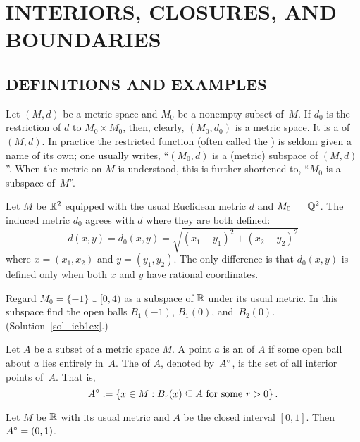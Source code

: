 \chapter{INTERIORS, CLOSURES, AND BOUNDARIES}


\section{DEFINITIONS AND EXAMPLES}
\begin{defn} Let $(M,d)$ be a metric space and $M_0$ be a nonempty subset of~$M$.  If $d_0$
is the restriction of $d$ to $M_0 \times M_0$, then, clearly, $(M_0,d_0)$ is a metric space.
It is a
 of~$(M,d)$. In practice the restricted function (often called the
) is seldom given a name of its own; one usually writes, ``$(M_0,d)$ is a
(metric) subspace of $(M,d)$''. When the metric on $M$ is understood, this is further
shortened to, ``$M_0$ is a subspace of~$M$''.
\end{defn}

\begin{exam} Let $M$ be $\mathbb{R}^2$ equipped with the usual Euclidean metric $d$ and $M_0 =~\mathbb{Q}^2$.
The induced metric $d_0$ agrees with $d$ where they are both defined:
   \[ d(x,y) = d_0(x,y) = \sqrt{(x_1 - y_1)^2 + (x_2 - y_2)^2} \]
where $x = (x_1,x_2)$ and $y = (y_1,y_2)$.  The only difference is that $d_0(x,y)$ is defined
only when both $x$ and $y$ have rational coordinates.
\end{exam}

\begin{exer}\label{icb1ex} Regard $M_0 = \{-1\} \cup [0,4)$ as a subspace of $\mathbb{R}$ under its
usual metric. In this subspace find the open balls $B_1(-1)$, $B_1(0)$, and~$B_2(0)$.
(Solution~\ref{sol_icb1ex}.)
\end{exer}

\begin{defn} Let $A$ be a subset of a metric space $M$. A point $a$ is an
 of $A$ if some open ball about $a$ lies entirely in~$A$.  The
 of $A$, denoted
by~$A^{\circ}$, is the set of all interior points of~$A$. That is,
  \[ A^{\circ} := \{x \in M: B_r(x) \subseteq A \text{ for some } r > 0\}\,. \]
\end{defn}

\begin{exam} Let $M$ be $\mathbb{R}$ with its usual metric and $A$ be the closed interval $[0,1]$.
Then $A^{\circ} = (0,1)$.
\end{exam}

